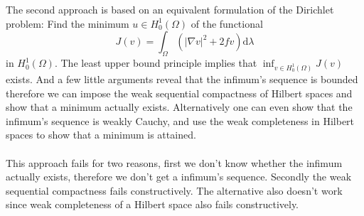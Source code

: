 \documentclass[11pt,a4paper,leqno]{report}
\numberwithin{equation}{chapter}
\begin{document}
\\
\\
The second approach is based on an equivalent formulation of the Dirichlet problem: Find the minimum $u\in H^1_0(\Omega)$ of the functional
\begin{equation} J(v)=\int_\Omega (|\nabla v|^2+2 fv)\mathrm{d}\lambda\end{equation}
in $H^1_0(\Omega)$. The least upper bound principle implies that $\inf_{v\in H^1_0(\Omega)} J(v)$ exists. And a few little arguments reveal that the infimum's sequence is bounded therefore we can impose the weak sequential compactness of Hilbert spaces and show that a minimum actually exists. Alternatively one can even show \cite[Corollary 4 p.23]{Wang} that the infimum's sequence is weakly Cauchy, and use the weak completeness in Hilbert spaces to show that a minimum is attained.\\
\\
This approach fails for two reasons, first we don't know whether the infimum actually exists, therefore we don't get a infimum's sequence. Secondly the weak sequential compactness fails constructively. The alternative also doesn't work since weak completeness of a Hilbert space also fails constructively.
\end{document}
